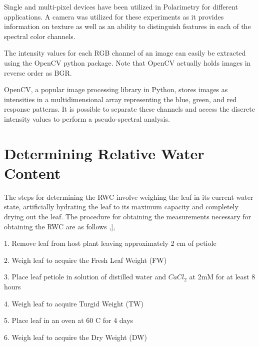 Single and multi-pixel devices have been utilized in Polarimetry for different applications.  A camera was utilized for these experiments as it provides information on texture as well as an ability to distinguish features in each of the spectral color channels.

The intensity values for each RGB channel of an image can easily be extracted using the OpenCV python package.  Note that OpenCV actually holds images in reverse order as BGR.

OpenCV, a popular image processing library in Python, stores images as intensities in a multidimensional array representing the blue, green, and red response patterns.  It is possible to separate these channels and access the discrete intensity values to perform a pseudo-spectral analysis.

\section{Determining Relative Water Content}
The steps for determining the RWC involve weighing the leaf in its current water state, artificially hydrating the leaf to its maximum capacity and completely drying out the leaf.  The procedure for obtaining the measurements necessary for obtaining the RWC are as follows \cite{ecophysiology},\cite{rwc:1}],

1.	Remove leaf from host plant leaving approximately 2 cm of petiole

2.	Weigh leaf to acquire the Fresh Leaf Weight (FW)

3.	Place leaf petiole in solution of distilled water and ${CaCl}_2$ at 2mM for at least 8 hours

4.	Weigh leaf to acquire Turgid Weight (TW)

5.	Place leaf in an oven at 60 \textdegree C for 4 days

6.	Weigh leaf to acquire the Dry Weight (DW)



